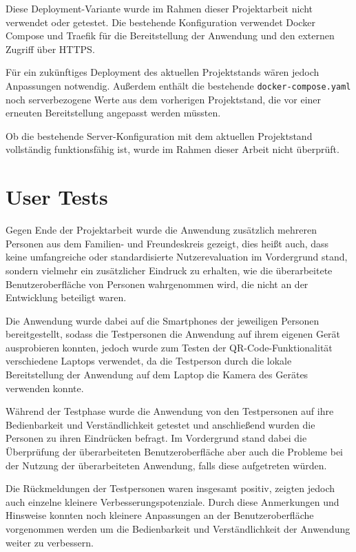 ﻿\documentclass[oneside]{ausarbeitung}
\begin{document}
Diese Deployment-Variante wurde im Rahmen dieser Projektarbeit nicht verwendet oder getestet. Die bestehende Konfiguration verwendet Docker Compose 
und Traefik für die Bereitstellung der Anwendung und den externen Zugriff über HTTPS.

Für ein zukünftiges Deployment des aktuellen Projektstands wären jedoch Anpassungen notwendig. Außerdem enthält die bestehende \texttt{docker-compose.yaml} 
noch serverbezogene Werte aus dem vorherigen Projektstand, die vor einer erneuten Bereitstellung angepasst werden müssten.

Ob die bestehende Server-Konfiguration mit dem aktuellen Projektstand vollständig funktionsfähig ist, wurde im Rahmen dieser Arbeit nicht überprüft.


\chapter{User Tests}
\label{cha:user-tests}

Gegen Ende der Projektarbeit wurde die Anwendung zusätzlich mehreren Personen aus dem Familien- und Freundeskreis gezeigt, dies heißt auch, dass
keine umfangreiche oder standardisierte Nutzerevaluation im Vordergrund stand, sondern vielmehr ein zusätzlicher Eindruck zu erhalten, wie die
überarbeitete Benutzeroberfläche von Personen wahrgenommen wird, die nicht an der Entwicklung beteiligt waren.

Die Anwendung wurde dabei auf die Smartphones der jeweiligen Personen bereitgestellt, sodass die Testpersonen die Anwendung auf ihrem eigenen
Gerät ausprobieren konnten, jedoch wurde zum Testen der QR-Code-Funktionalität verschiedene Laptops verwendet, da die Testperson durch die lokale 
Bereitstellung der Anwendung auf dem Laptop die Kamera des Gerätes verwenden konnte.

Während der Testphase wurde die Anwendung von den Testpersonen auf ihre Bedienbarkeit und Verständlichkeit getestet und anschließend wurden die
Personen zu ihren Eindrücken befragt. Im Vordergrund stand dabei die Überprüfung der überarbeiteten Benutzeroberfläche aber auch die Probleme bei der 
Nutzung der überarbeiteten Anwendung, falls diese aufgetreten würden.

Die Rückmeldungen der Testpersonen waren insgesamt positiv, zeigten jedoch auch einzelne kleinere Verbesserungspotenziale. Durch diese Anmerkungen
und Hinsweise konnten noch kleinere Anpassungen an der Benutzeroberfläche vorgenommen werden um die Bedienbarkeit und Verständlichkeit der
Anwendung weiter zu verbessern.
\end{document}
